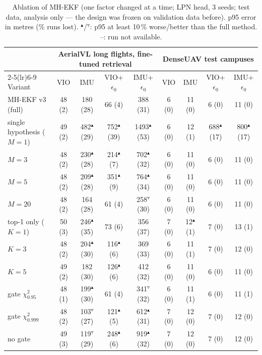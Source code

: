 \begin{table}[t]
\centering
\caption{Ablation of MH-EKF (one factor changed at a time; LPN head, 3 seeds; test data, analysis only --- the design was frozen on validation data before). p95 error in metres (\% runs lost). $^\blacktriangle$/$^\triangledown$: p95 at least 10\,\% worse/better than the full method. --: run not available.}
\label{tab:ablation}
\setlength{\tabcolsep}{3.5pt}
\small
\begin{tabular}{lcccccccc}
\toprule
 & \multicolumn{4}{c}{AerialVL long flights, fine-tuned retrieval} & \multicolumn{4}{c}{DenseUAV test campuses} \\
\cmidrule(lr){2-5}\cmidrule(lr){6-9}
Variant & VIO & IMU & VIO+$\epsilon_0$ & IMU+$\epsilon_0$ & VIO & IMU & VIO+$\epsilon_0$ & IMU+$\epsilon_0$ \\
\midrule
MH-EKF v3 (full) & 48 (2) & 180 (28) & 66 (4) & 388 (31) & 6 (0) & 11 (0) & 6 (0) & 11 (0) \\
\midrule
single hypothesis ($M=1$) & 49 (2) & 482$^\blacktriangle$ (29) & 752$^\blacktriangle$ (39) & 1493$^\blacktriangle$ (53) & 6 (0) & 12 (1) & 688$^\blacktriangle$ (17) & 800$^\blacktriangle$ (17) \\
$M=3$ & 48 (2) & 230$^\blacktriangle$ (28) & 214$^\blacktriangle$ (7) & 702$^\blacktriangle$ (32) & 6 (0) & 11 (0) & 6 (0) & 11 (0) \\
$M=5$ & 48 (2) & 209$^\blacktriangle$ (28) & 351$^\blacktriangle$ (9) & 764$^\blacktriangle$ (34) & 6 (0) & 11 (0) & 6 (0) & 11 (0) \\
$M=20$ & 48 (2) & 164 (28) & 61 (4) & 258$^\triangledown$ (30) & 6 (0) & 11 (0) & 6 (0) & 11 (0) \\
top-1 only ($K=1$) & 50 (3) & 246$^\blacktriangle$ (35) & 73 (6) & 356 (37) & 7 (0) & 12$^\blacktriangle$ (1) & 7 (0) & 13 (1) \\
$K=3$ & 48 (2) & 204$^\blacktriangle$ (30) & 116$^\blacktriangle$ (6) & 369 (33) & 6 (0) & 11 (1) & 7 (0) & 12 (0) \\
$K=5$ & 49 (2) & 182 (30) & 126$^\blacktriangle$ (6) & 412 (32) & 6 (0) & 11 (0) & 6 (0) & 11 (0) \\
gate $\chi^2_{0.95}$ & 48 (1) & 199$^\blacktriangle$ (30) & 61 (4) & 341$^\triangledown$ (32) & 6 (0) & 11 (1) & 6 (0) & 11 (1) \\
gate $\chi^2_{0.999}$ & 48 (2) & 103$^\triangledown$ (27) & 121$^\blacktriangle$ (5) & 612$^\blacktriangle$ (31) & 7 (0) & 12 (0) & 7 (0) & 12 (0) \\
no gate & 49 (3) & 119$^\triangledown$ (29) & 248$^\blacktriangle$ (6) & 919$^\blacktriangle$ (32) & 7 (0) & 12 (0) & 7 (0) & 12 (0) \\

\end{tabular}
\end{table}
